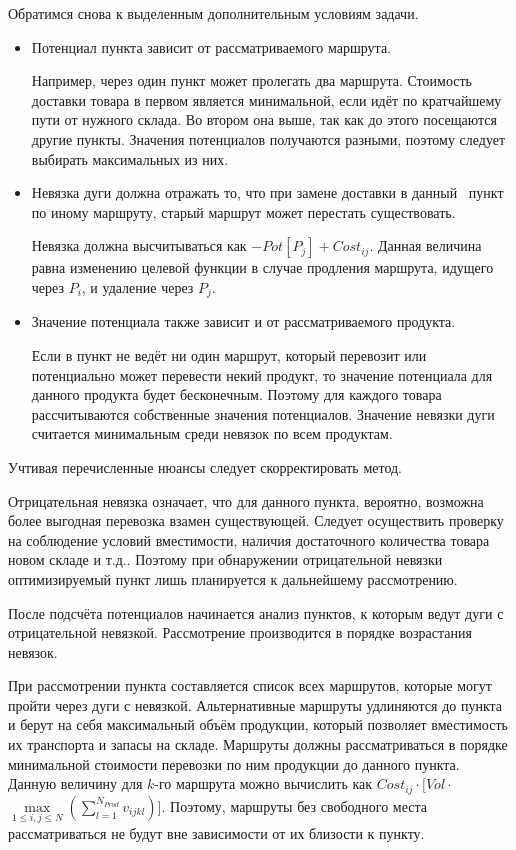 	Обратимся снова к выделенным дополнительным условиям задачи.
	\begin{itemize}
		\item Потенциал пункта зависит от рассматриваемого маршрута.
		
		Например, через один пункт может пролегать два маршрута. Стоимость доставки товара в первом является минимальной, если идёт по кратчайшему пути от нужного склада. Во втором она выше, так как до этого посещаются другие пункты. Значения потенциалов получаются разными, поэтому следует выбирать максимальных из них.
		
		\item Невязка дуги должна отражать то, что при замене доставки в данный \, пункт по иному маршруту, старый маршрут может перестать существовать.
		
		Невязка должна высчитываться как $-Pot[P_j] + Cost_{ij}$. Данная величина равна изменению целевой функции в случае продления маршрута, идущего через $P_i$, и удаление через $P_j$.
		
		\item Значение потенциала также зависит и от рассматриваемого продукта.
		
		Если в пункт не ведёт ни один маршрут, который перевозит или потенциально может перевести некий продукт, то значение потенциала для данного продукта будет бесконечным. Поэтому для каждого товара рассчитываются собственные значения потенциалов. Значение невязки дуги считается минимальным среди невязок по всем продуктам.
	\end{itemize}

	Учтивая перечисленные нюансы следует скорректировать метод.
	
	Отрицательная невязка означает, что для данного пункта, вероятно, возможна более выгодная перевозка взамен существующей. Следует осуществить проверку на соблюдение условий вместимости, наличия достаточного количества товара новом складе и т.д.. Поэтому при обнаружении отрицательной невязки оптимизируемый пункт лишь планируется к дальнейшему рассмотрению.
	
	После подсчёта потенциалов начинается анализ пунктов, к которым ведут дуги с отрицательной невязкой. Рассмотрение производится в порядке возрастания невязок. 
	
	При рассмотрении пункта составляется список всех маршрутов, которые могут пройти через дуги с невязкой. Альтернативные маршруты удлиняются до пункта и берут на себя максимальный объём продукции, который позволяет вместимость их транспорта и запасы на складе. Маршруты должны рассматриваться в порядке минимальной стоимости перевозки по ним продукции до данного пункта. Данную величину для $k$-го маршрута можно вычислить как $Cost_{ij} \cdot [Vol \cdot $\(\max\limits_{1 \leq i, j \leq N}\)$ (\sum_{l=1}^{N_{Prod}} v_{ijkl})]$. Поэтому, маршруты без свободного места рассматриваться не будут вне зависимости от их близости к пункту. 
	
